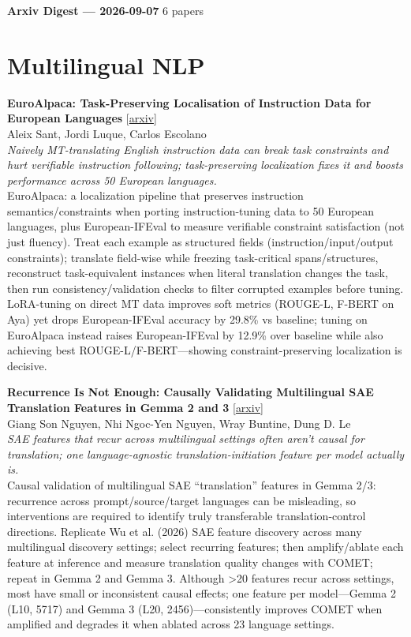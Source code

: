 \documentclass[12pt,letterpaper]{article}
\begin{document}
{\footnotesize\textbf{Arxiv Digest --- 2026-09-07} \hfill 6 papers}

\smallskip

\section*{Multilingual NLP}

{\small\textbf{EuroAlpaca: Task-Preserving Localisation of Instruction Data for European Languages}} {\scriptsize[\href{https://arxiv.org/abs/2609.05043}{arxiv}]}\\
{\scriptsize Aleix Sant, Jordi Luque, Carlos Escolano}\\

{\small\textit{Naively MT-translating English instruction data can break task constraints and hurt verifiable instruction following; task-preserving localization fixes it and boosts performance across 50 European languages.}}\\[1pt]
{\footnotesize EuroAlpaca: a localization pipeline that preserves instruction semantics/constraints when porting instruction-tuning data to 50 European languages, plus European-IFEval to measure verifiable constraint satisfaction (not just fluency). Treat each example as structured fields (instruction/input/output constraints); translate field-wise while freezing task-critical spans/structures, reconstruct task-equivalent instances when literal translation changes the task, then run consistency/validation checks to filter corrupted examples before tuning. LoRA-tuning on direct MT data improves soft metrics (ROUGE-L, F-BERT on Aya) yet drops European-IFEval accuracy by 29.8\% vs baseline; tuning on EuroAlpaca instead raises European-IFEval by 12.9\% over baseline while also achieving best ROUGE-L/F-BERT---showing constraint-preserving localization is decisive.}

\medskip

{\small\textbf{Recurrence Is Not Enough: Causally Validating Multilingual SAE Translation Features in Gemma 2 and 3}} {\scriptsize[\href{https://arxiv.org/abs/2609.04808}{arxiv}]}\\
{\scriptsize Giang Son Nguyen, Nhi Ngoc-Yen Nguyen, Wray Buntine, Dung D. Le}\\

{\small\textit{SAE features that recur across multilingual settings often aren't causal for translation; one language-agnostic translation-initiation feature per model actually is.}}\\[1pt]
{\footnotesize Causal validation of multilingual SAE ``translation'' features in Gemma 2/3: recurrence across prompt/source/target languages can be misleading, so interventions are required to identify truly transferable translation-control directions. Replicate Wu et al. (2026) SAE feature discovery across many multilingual discovery settings; select recurring features; then amplify/ablate each feature at inference and measure translation quality changes with COMET; repeat in Gemma 2 and Gemma 3. Although >20 features recur across settings, most have small or inconsistent causal effects; one feature per model---Gemma 2 (L10, 5717) and Gemma 3 (L20, 2456)---consistently improves COMET when amplified and degrades it when ablated across 23 language settings.}
\end{document}
